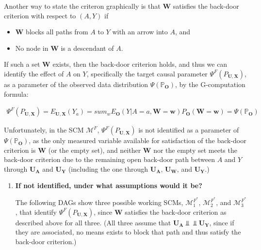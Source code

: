 \documentclass{article}\usepackage[]{graphicx}\usepackage[]{xcolor}
\begin{document}
\begin{enumerate}[label=\textbf{\arabic*.}]
Another way to state the criteron graphically is that $\bm{W}$ satisfies the back-door criterion with respect to $(A,Y)$ if
  
  \begin{itemize}
    \item $\bm{W}$ blocks all paths from $A$ to $Y$ with an arrow into $A$, and
    \item No node in $\bm{W}$ is a descendant of $A$.
  \end{itemize}
  
If such a set $\bm{W}$ exists, then the back-door criterion holds, and thus we can identify the effect of $A$ on $Y$, specifically the target causal parameter $\Psi^F(P_{\bm{U},\bm{X}})$, as a parameter of the observed data distribution $\Psi(\mathbb{P}_{\bm{O}})$, by the G-computation formula:

\begin{align*}
\Psi^F(P_{\bm{U},\bm{X}}) = E_{\bm{U},\bm{X}}(Y_a)=sum_{w}E_{\bm{O}}(Y|A=a,\bm{W}=\bm{w})P_{\bm{O}}(\bm{W}=\bm{w})=\Psi(\mathbb{P}_{\bm{O}})
\end{align*}
  
Unfortunately, in the SCM $\mathcal{M}^{F}$, $\Psi^F(P_{\bm{U},\bm{X}})$ is not identified as a parameter of $\Psi(\mathbb{P}_{\bm{O}})$, as the only measured variable available for satisfaction of the back-door criterion is $\bm{W}$ (or the empty set), and neither $\bm{W}$ nor the empty set meets the back-door criterion due to the remaining open back-door path between $A$ and $Y$ through $\bm{U_A}$ and $\bm{U_Y}$ (including the one through $\bm{U_A}$, $\bm{U_W}$, and $\bm{U_Y}$.)
  
  \begin{enumerate}[label=\textbf{(\alph*)}]
  
    \item \textbf{If not identified, under what assumptions would it be?}
    
The following DAGs show three possible working SCMs, $\mathcal{M}^{F^*}_1$, $\mathcal{M}^{F^*}_2$, and $\mathcal{M}^{F^*}_3$, that identify $\Psi^F(P_{\bm{U},\bm{X}})$, since $\bm{W}$ satisfies the back-door criterion as described above for all three. (All three assume that $\bm{U_A} \Perp \!\!\! \Perp \bm{U_Y}$, since if they are associated, no means exists to block that path and thus satisfy the back-door criterion.)
    
\pagebreak
    
\begin{itemize}


\end{itemize}
\end{enumerate}
\end{enumerate}
\end{document}
